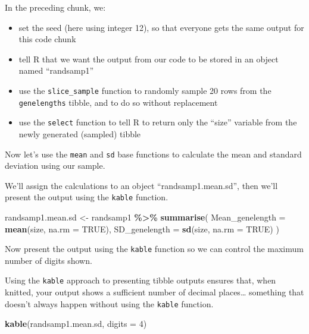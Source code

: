 \documentclass[
]{book}
\newenvironment{Shaded}{\begin{snugshade}}{\end{snugshade}}
\newcommand{\AttributeTok}[1]{\textcolor[rgb]{0.13,0.29,0.53}{#1}}
\newcommand{\ConstantTok}[1]{\textcolor[rgb]{0.56,0.35,0.01}{#1}}
\newcommand{\DecValTok}[1]{\textcolor[rgb]{0.00,0.00,0.81}{#1}}
\newcommand{\FunctionTok}[1]{\textcolor[rgb]{0.13,0.29,0.53}{\textbf{#1}}}
\newcommand{\NormalTok}[1]{#1}
\newcommand{\OtherTok}[1]{\textcolor[rgb]{0.56,0.35,0.01}{#1}}
\newcommand{\SpecialCharTok}[1]{\textcolor[rgb]{0.81,0.36,0.00}{\textbf{#1}}}
\providecommand{\tightlist}{%
  \setlength{\itemsep}{0pt}\setlength{\parskip}{0pt}}
\begin{document}
In the preceding chunk, we:

\begin{itemize}
\tightlist
\item
  set the seed (here using integer 12), so that everyone gets the same output for this code chunk
\item
  tell R that we want the output from our code to be stored in an object named ``randsamp1''
\item
  use the \texttt{slice\_sample} function to randomly sample 20 rows from the \texttt{genelengths} tibble, and to do so without replacement
\item
  use the \texttt{select} function to tell R to return only the ``size'' variable from the newly generated (sampled) tibble
\end{itemize}

Now let's use the \texttt{mean} and \texttt{sd} base functions to calculate the mean and standard deviation using our sample.

We'll assign the calculations to an object ``randsamp1.mean.sd'', then we'll present the output using the \texttt{kable} function.

\begin{Shaded}
\begin{Highlighting}[]
\NormalTok{randsamp1.mean.sd }\OtherTok{\textless{}{-}}\NormalTok{ randsamp1 }\SpecialCharTok{\%\textgreater{}\%}
  \FunctionTok{summarise}\NormalTok{(}
    \AttributeTok{Mean\_genelength =} \FunctionTok{mean}\NormalTok{(size, }\AttributeTok{na.rm =} \ConstantTok{TRUE}\NormalTok{),}
    \AttributeTok{SD\_genelength =} \FunctionTok{sd}\NormalTok{(size, }\AttributeTok{na.rm =} \ConstantTok{TRUE}\NormalTok{)}
\NormalTok{  )}
\end{Highlighting}
\end{Shaded}

Now present the output using the \texttt{kable} function so we can control the maximum number of digits shown.

Using the \texttt{kable} approach to presenting tibble outputs ensures that, when knitted, your output shows a sufficient number of decimal places\ldots{} something that doesn't always happen without using the \texttt{kable} function.

\begin{Shaded}
\begin{Highlighting}[]
\FunctionTok{kable}\NormalTok{(randsamp1.mean.sd, }\AttributeTok{digits =} \DecValTok{4}\NormalTok{)}
\end{Highlighting}
\end{Shaded}
\end{document}
